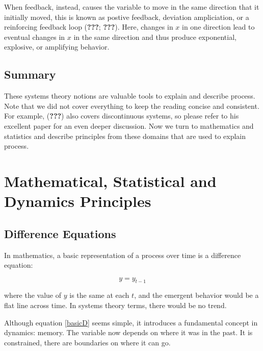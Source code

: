 \documentclass[english,,man]{apa6}
\theoremstyle{definition}
\theoremstyle{definition}
\theoremstyle{definition}
\theoremstyle{remark}
\begin{document}
When feedback, instead, causes the variable to move in the same
direction that it initially moved, this is known as postive feedback,
deviation ampliciation, or a reinforcing feedback loop ({\textbf{???}};
{\textbf{???}}). Here, changes in \(x\) in one direction lead to
eventual changes in \(x\) in the same direction and thus produce
exponential, explosive, or amplifying behavior.

\hypertarget{summary}{%
\subsection{Summary}\label{summary}}

These systems theory notions are valuable tools to explain and describe
process. Note that we did not cover everything to keep the reading
concise and consistent. For example, ({\textbf{???}}) also covers
discontinuous systems, so please refer to his excellent paper for an
even deeper discussion. Now we turn to mathematics and statistics and
describe principles from these domains that are used to explain process.

\hypertarget{mathematical-statistical-and-dynamics-principles}{%
\section{Mathematical, Statistical and Dynamics
Principles}\label{mathematical-statistical-and-dynamics-principles}}

\hypertarget{difference-equations}{%
\subsection{Difference Equations}\label{difference-equations}}

In mathematics, a basic representation of a process over time is a
difference equation:

\begin{equation}
\label{basicD}
y = y_{t - 1}
\end{equation}

\noindent where the value of \(y\) is the same at each \(t\), and the
emergent behavior would be a flat line across time. In systems theory
terms, there would be no trend.

Although equation \ref{basicD} seems simple, it introduces a fundamental
concept in dynamics: memory. The variable now depends on where it was in
the past. It is constrained, there are boundaries on where it can go.
\end{document}
